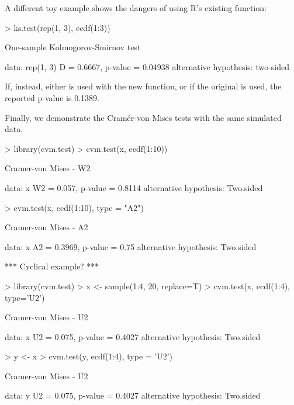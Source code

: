 A different toy example shows the dangers of using R's existing
 function:
\begin{Schunk}
\begin{Sinput}
> ks.test(rep(1, 3), ecdf(1:3))
\end{Sinput}
\begin{Soutput}
	One-sample Kolmogorov-Smirnov test

data:  rep(1, 3) 
D = 0.6667, p-value = 0.04938
alternative hypothesis: two-sided 
\end{Soutput}
\end{Schunk}
If, instead, either  is used with the new
 function, or if the original 
is used, the reported p-value is 0.1389.

Finally, we demonstrate the Cram\'{e}r-von Mises tests with the same
simulated data. 
\begin{Schunk}
\begin{Sinput}
> library(cvm.test)
> cvm.test(x, ecdf(1:10))
\end{Sinput}
\begin{Soutput}
	Cramer-von Mises - W2

data:  x 
W2 = 0.057, p-value = 0.8114
alternative hypothesis: Two.sided 
\end{Soutput}
\begin{Sinput}
> cvm.test(x, ecdf(1:10), type = "A2")
\end{Sinput}
\begin{Soutput}
	Cramer-von Mises - A2

data:  x 
A2 = 0.3969, p-value = 0.75
alternative hypothesis: Two.sided 
\end{Soutput}
\end{Schunk}

*** Cyclical example? ***

\begin{Schunk}
\begin{Sinput}
> library(cvm.test)
> x <- sample(1:4, 20, replace=T)
> cvm.test(x, ecdf(1:4), type='U2')
\end{Sinput}
\begin{Soutput}
	Cramer-von Mises - U2

data:  x 
U2 = 0.075, p-value = 0.4027
alternative hypothesis: Two.sided 
\end{Soutput}
\begin{Sinput}
> y <- x%
> cvm.test(y, ecdf(1:4), type = 'U2')
\end{Sinput}
\begin{Soutput}
	Cramer-von Mises - U2

data:  y 
U2 = 0.075, p-value = 0.4027
alternative hypothesis: Two.sided 
\end{Soutput}
\end{Schunk}





